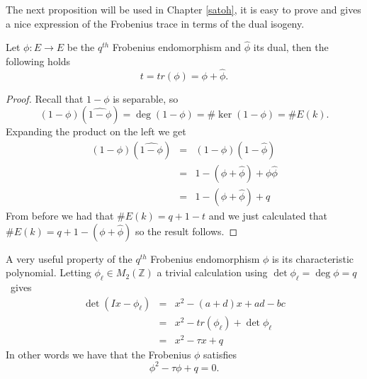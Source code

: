 The next proposition will be used in Chapter \ref{satoh}, it is easy to prove and gives a nice
expression of the Frobenius trace in terms of the dual isogeny.

\begin{prop}
 Let $\phi: E \rightarrow E$ be the $q^{th}$ Frobenius endomorphism and $\widehat{\phi}$ its dual, then
the following holds
$$ t = tr(\phi) = \phi + \widehat{\phi}.$$
\end{prop}
\begin{proof}
 Recall that $1-\phi$ is separable, so $$(1-\phi)(\widehat{1-\phi}) = \deg(1-\phi) = \#\ker(1-\phi) = \#E(k).$$
Expanding the product on the left we get
\begin{eqnarray}
 (1-\phi)(\widehat{1-\phi}) &=& (1-\phi)(1-\widehat{\phi}) \nonumber \\
			    &=& 1 - (\phi + \widehat{\phi}) + \phi\widehat{\phi} \nonumber \\
			    &=& 1 - (\phi + \widehat{\phi}) + q \nonumber
\end{eqnarray}
From before we had that $\#E(k) = q + 1 - t$ and we just calculated that $\#E(k) = q + 1 - (\phi +\widehat{\phi})$ so
the result follows.
\end{proof}

A very useful property of the $q^{th}$ Frobenius endomorphism $\phi$ is its characteristic polynomial. Letting
$\phi_\ell\in M_2(\mathbb{Z})$ a trivial calculation using $\det \phi_\ell = \deg \phi = q\,$ gives
\begin{eqnarray}
  \det(Ix - \phi_\ell) &=& x^2 -(a+d)x + ad - bc \nonumber \\
		       &=& x^2 - tr(\phi_\ell) + \det \phi_\ell \nonumber \\
		       &=& x^2 -\tau x + q \nonumber
\end{eqnarray}
In other words we have that the Frobenius $\phi$ satisfies
$$ \phi^2 - \tau \phi + q = 0.$$